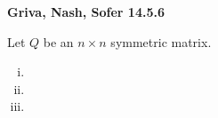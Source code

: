 \textbf{Griva, Nash, Sofer 14.5.6}

Let $Q$ be an $n \times n$ symmetric matrix.

\begin{enumerate}[(i)]
    \item 
    \pagebreak
    \item 
    \pagebreak
    \item 
\end{enumerate}